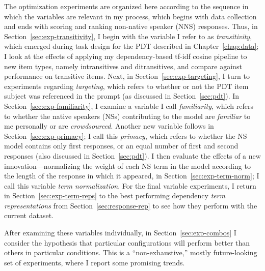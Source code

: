 The optimization experiments are organized here according to the sequence in which the variables are relevant in my process, which begins with data collection and ends with scoring and ranking non-native speaker (NNS) responses. Thus, in Section~\ref{sec:exp-transitivity}, I begin with the variable I refer to as \textit{transitivity}, which emerged during task design for the PDT described in Chapter~\ref{chap:data}; I look at the effects of applying my dependency-based tf-idf cosine pipeline to new item types, namely intransitives and ditransitives, and compare against performance on transitive items. Next, in Section~\ref{sec:exp-targeting}, I turn to experiments regarding \textit{targeting}, which refers to whether or not the PDT item subject was referenced in the prompt (as discussed in Section~\ref{sec:pdt}). In Section~\ref{sec:exp-familiarity}, I examine a variable I call \textit{familiarity}, which refers to whether the native speakers (NSs) contributing to the model are \textit{familiar} to me personally or are \textit{crowdsourced}. Another new variable follows in Section~\ref{sec:exp-primacy}; I call this \textit{primacy}, which refers to whether the NS model contains only first responses, or an equal number of first and second responses (also discussed in Section~\ref{sec:pdt}). I then evaluate the effects of a new innovation---normalizing the weight of each NS term in the model according to the length of the response in which it appeared, in Section~\ref{sec:exp-term-norm}; I call this variable \textit{term normalization}. For the final variable experiments, I return in Section~\ref{sec:exp-term-reps} to the best performing dependency \textit{term representations} from Section~\ref{sec:response-rep} to see how they perform with the current dataset.

After examining these variables individually, in Section~\ref{sec:exp-combos} I consider the hypothesis that particular configurations  will perform better than others in particular conditions. This is a ``non-exhaustive,'' mostly future-looking set of experiments, where I report some promising trends.


